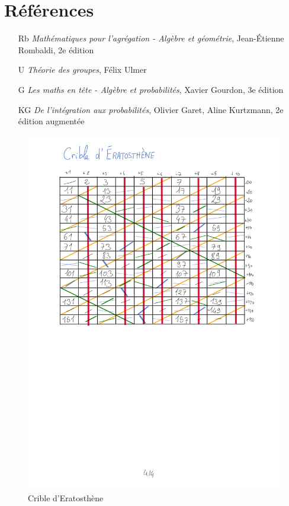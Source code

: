 \documentclass[10pt, a4paper, parskip=full, twoside, twocolumn]{report}
\begin{document}
\section*{Références}
\begin{itemize}
	\item[Rb] \emph{Mathématiques pour l'agrégation - Algèbre et géométrie}, Jean-Étienne Rombaldi, 2e édition
	\item[U] \emph{Théorie des groupes}, Félix Ulmer
	\item[G] \emph{Les maths en tête - Algèbre et probabilités}, Xavier Gourdon, 3e édition
	\item[KG] \emph{De l'intégration aux probabilités}, Olivier Garet, Aline Kurtzmann, 2e édition augmentée
\end{itemize}
\begin{figure}[!htb]
	\centering
	\includegraphics[trim={0 0 0 0},clip,width=1\linewidth]{img/eratosthene.pdf}
	\caption{Crible d'Eratosthène}
\end{figure}
\end{document}
